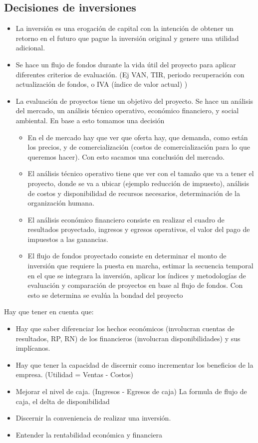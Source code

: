 \documentclass[titlepage,a4paper]{article}
\begin{document}
\subsection{Decisiones de inversiones}
\begin{itemize}
\item La inversión es una erogación de capital con la intención de obtener un retorno en el futuro que pague la inversión original y genere una utilidad adicional.
\item Se hace un flujo de fondos durante la vida útil del proyecto para aplicar diferentes criterios de evaluación. (Ej VAN, TIR, periodo recuperación con actualización de fondos, o IVA (índice de valor actual) )
\item La evaluación de proyectos tiene un objetivo del proyecto. Se hace un análisis del mercado, un análisis técnico operativo, económico financiero, y social ambiental. En base a esto tomamos una decisión
\begin{itemize}
\item En el de mercado hay que ver que oferta hay, que demanda, como están los precios, y de comercialización (costos de comercialización para lo que queremos hacer). Con esto sacamos una conclusión del mercado.
\item El análisis técnico operativo tiene que ver con el tamaño que va a tener el proyecto, donde se va a ubicar (ejemplo reducción de impuesto), análisis de costos y disponibilidad de recursos necesarios, determinación de la organización humana.
\item El análisis económico financiero consiste en realizar el cuadro de resultados proyectado, ingresos y egresos operativos, el valor del pago de impuestos a las ganancias.
\item El flujo de fondos proyectado consiste en determinar el monto de inversión que requiere la puesta en marcha, estimar la secuencia temporal en el que se integrara la inversión, aplicar los índices y metodologías de evaluación y comparación de proyectos en base al flujo de fondos. Con esto se determina se evalúa la bondad del proyecto
\end{itemize}
\end{itemize}


Hay que tener en cuenta que:

\begin{itemize}
\item Hay que saber diferenciar los hechos económicos (involucran cuentas de resultados, RP, RN) de los financieros (involucran disponibilidades) y sus implícanos.
\item Hay que tener la capacidad de discernir como incrementar los beneficios de la empresa. (Utilidad = Ventas - Costos)
\item Mejorar el nivel de caja. (Ingresos - Egresos de caja) La formula de flujo de caja, el delta de disponibilidad
\item Discernir la conveniencia de realizar una inversión.
\item Entender la rentabilidad económica y financiera
\end{itemize}
\end{document}
